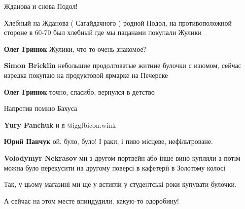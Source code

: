  
 
 
 
 

Жданова и снова Подол!


Хлебный на Жданова ( Сагайдачного ) родной Подол, на противоположной стороне в 60-70
был хлебный где мы пацанами покупали Жулики

\textbf{Олег Гринюк} Жулики, что-то очень знакомое?

\textbf{Simon Bricklin} небольшие продолговатые житние булочки с изюмом, сейчас
изредка покупаю на продуктовой ярмарке на Печерске

\textbf{Олег Гринюк} точно, спасибо, вернулся в детство

Напротив помню Бахуса

\textbf{Yury Panchuk} и я  @igg{fbicon.wink} 

\textbf{Юрий Панчук} ой, було, було! І раки, і пиво місцеве, нефільтроване.

\textbf{Volodymyr Nekrasov} ми з другом портвейн або інше вино купляли а потім можна було перекусити на другому поверсі в кафетерії в Золотому колосі

Так, у цьому магазині ми ще у встигли у студентські роки купувати булочки.

А сейчас на этом месте впиндудили, какую-то одоробину!
